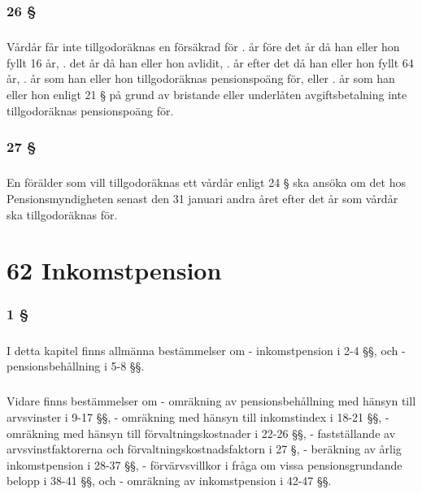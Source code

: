 \documentclass[a4paper,notitlepage,openany,10pt]{book}
\begin{document}
\subsection*{26 §}
\paragraph*{}
Vårdår får inte tillgodoräknas en försäkrad för
. år före det år då han eller hon fyllt 16 år,
. det år då han eller hon avlidit,
. år efter det då han eller hon fyllt 64 år,
. år som han eller hon tillgodoräknas pensionspoäng för, eller
. år som han eller hon enligt 21 § på grund av bristande eller underlåten avgiftsbetalning inte tillgodoräknas pensionspoäng för.
\subsection*{27 §}
\paragraph*{}
En förälder som vill tillgodoräknas ett vårdår enligt 24 § ska ansöka om det hos Pensionsmyndigheten senast den 31 januari andra året efter det år som vårdår ska tillgodoräknas för.
\chapter*{62 Inkomstpension}
\subsection*{1 §}
\paragraph*{}
I detta kapitel finns allmänna bestämmelser om
\newline - inkomstpension i 2-4 §§, och
\newline - pensionsbehållning i 5-8 §§.
\paragraph*{}
Vidare finns bestämmelser om
\newline - omräkning av pensionsbehållning med hänsyn till arvsvinster i 9-17 §§,
\newline - omräkning med hänsyn till inkomstindex i 18-21 §§,
\newline - omräkning med hänsyn till förvaltningskostnader i 22-26 §§,
\newline - fastställande av arvsvinstfaktorerna och förvaltningskostnadsfaktorn i 27 §,
\newline - beräkning av årlig inkomstpension i 28-37 §§,
\newline - förvärvsvillkor i fråga om vissa pensionsgrundande belopp i 38-41 §§, och
\newline - omräkning av inkomstpension i 42-47 §§.
\end{document}
